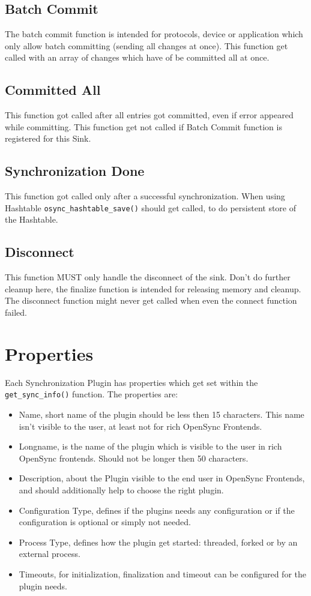\subsection{Batch Commit}
The batch commit function is intended for protocols, device or application which
only allow batch committing (sending all changes at once). This function get
called with an array of changes which have of be committed all at once.
\subsection{Committed All}
This function got called after all entries got committed, even if error appeared
while committing. This function get not called if Batch Commit function is
registered for this Sink.
\subsection{Synchronization Done}
This function got called only after a successful synchronization.
When using Hashtable \verb|osync_hashtable_save()| should get called, to
do persistent store of the Hashtable.
\subsection{Disconnect}
This function MUST only handle the disconnect of the sink. Don't do further
cleanup here, the finalize function is intended for releasing memory and
cleanup. The disconnect function might never get called when even the connect
function failed.
\section{Properties}
Each Synchronization Plugin has properties which get set within the
\verb|get_sync_info()| function. The properties are:

\begin{itemize}
\item Name, short name of the plugin should be less then 15 characters. This
name isn't visible to the user, at least not for rich OpenSync Frontends.
\item Longname, is the name of the plugin which is visible to the user in
rich OpenSync frontends. Should not be longer then 50 characters.
\item Description, about the Plugin visible to the end user in OpenSync
Frontends, and should additionally help to choose the right plugin.
\item Configuration Type, defines if the plugins needs any configuration or if
the configuration is optional or simply not needed.
\item Process Type, defines how the plugin get started: threaded, forked or by 
an external process.
\item Timeouts, for initialization, finalization and timeout can be configured
for the plugin needs. 
\end{itemize}

